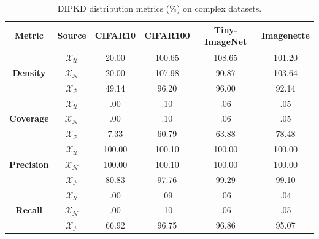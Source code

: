 \begin{table}[ht]
  \centering
  \begin{threeparttable}
    \caption[DIPKD distribution metrics on complex datasets.]{
      DIPKD distribution metrics (\%) on complex datasets.
    }
    \label{tab:abla-embeddings-coverage-objects}
    \small
    \begin{tabular}{c c c c c c}
      \toprule
      \textbf{Metric} & \textbf{Source} & \textbf{CIFAR10} & \textbf{CIFAR100} & \textbf{Tiny-ImageNet} & \textbf{Imagenette} \\
      \midrule
      & $\mathcal{X}_\mathcal{U}$ & \phantom{0}20.00 &           100.65 &           108.65 &           101.20 \\
      \textbf{Density}   & $\mathcal{X}_\mathcal{N}$ & \phantom{0}20.00 &           107.98 & \phantom{0}90.87 &           103.64 \\
      & $\mathcal{X}_\mathcal{P}$ & \phantom{0}49.14 & \phantom{0}96.20 & \phantom{0}96.00 & \phantom{0}92.14 \\
      \midrule
      & $\mathcal{X}_\mathcal{U}$ & \phantom{000}.00 & \phantom{000}.10 & \phantom{000}.06 & \phantom{000}.05 \\
      \textbf{Coverage}  & $\mathcal{X}_\mathcal{N}$ & \phantom{000}.00 & \phantom{000}.10 & \phantom{000}.06 & \phantom{000}.05 \\
      & $\mathcal{X}_\mathcal{P}$ & \phantom{00}7.33 & \phantom{0}60.79 & \phantom{0}63.88 & \phantom{0}78.48 \\
      \midrule
      & $\mathcal{X}_\mathcal{U}$ &           100.00 &           100.10 &           100.00 &           100.00 \\
      \textbf{Precision} & $\mathcal{X}_\mathcal{N}$ &           100.00 &           100.10 &           100.00 &           100.00 \\
      & $\mathcal{X}_\mathcal{P}$ & \phantom{0}80.83 & \phantom{0}97.76 & \phantom{0}99.29 & \phantom{0}99.10 \\
      \midrule
      & $\mathcal{X}_\mathcal{U}$ & \phantom{000}.00 & \phantom{000}.09 & \phantom{000}.06 & \phantom{000}.04 \\
      \textbf{Recall}    & $\mathcal{X}_\mathcal{N}$ & \phantom{000}.00 & \phantom{000}.10 & \phantom{000}.06 & \phantom{000}.05 \\
      & $\mathcal{X}_\mathcal{P}$ & \phantom{0}66.92 & \phantom{0}96.75 & \phantom{0}96.86 & \phantom{0}95.07 \\
      \bottomrule
    \end{tabular}
  \end{threeparttable}
\end{table}


